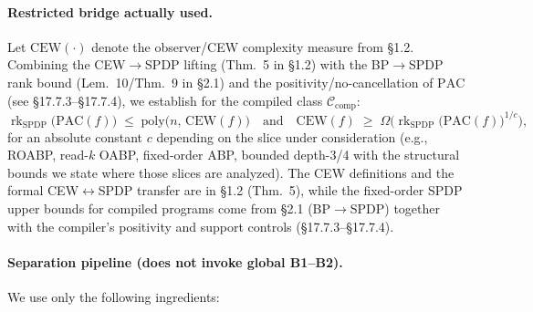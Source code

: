 \documentclass[12pt]{article}
\theoremstyle{definition}
\theoremstyle{definition}
\theoremstyle{remark}
\theoremstyle{remark}
\begin{document}
\paragraph{Restricted bridge actually used.}
Let $\mathrm{CEW}(\cdot)$ denote the observer/CEW complexity measure from \S1.2. Combining the CEW$\to$SPDP lifting (Thm.~5 in \S1.2) with the BP$\to$SPDP rank bound (Lem.~10/Thm.~9 in \S2.1) and the positivity/no-cancellation of $\mathrm{PAC}$ (see \S17.7.3--\S17.7.4), we establish for the compiled class $\mathcal{C}_{\mathrm{comp}}$:
\begin{equation}
\label{eq:restricted-bridge}
\operatorname{rk}_{\mathrm{SPDP}}\!\bigl(\mathrm{PAC}(f)\bigr) \;\le\; \mathrm{poly}\bigl(n,\, \mathrm{CEW}(f)\bigr)
\quad\text{and}\quad
\mathrm{CEW}(f) \;\ge\; \Omega\!\bigl(\operatorname{rk}_{\mathrm{SPDP}}\!\bigl(\mathrm{PAC}(f)\bigr)^{1/c}\bigr),
\end{equation}
for an absolute constant $c$ depending on the slice under consideration (e.g., ROABP, read-$k$ OABP, fixed-order ABP, bounded depth-3/4 with the structural bounds we state where those slices are analyzed). The CEW definitions and the formal CEW$\leftrightarrow$SPDP transfer are in \S1.2 (Thm.~5), while the fixed-order SPDP upper bounds for compiled programs come from \S2.1 (BP$\to$SPDP) together with the compiler's positivity and support controls (\S17.7.3--\S17.7.4).

\paragraph{Separation pipeline (does not invoke global B1--B2).}
We use only the following ingredients:
\end{document}
